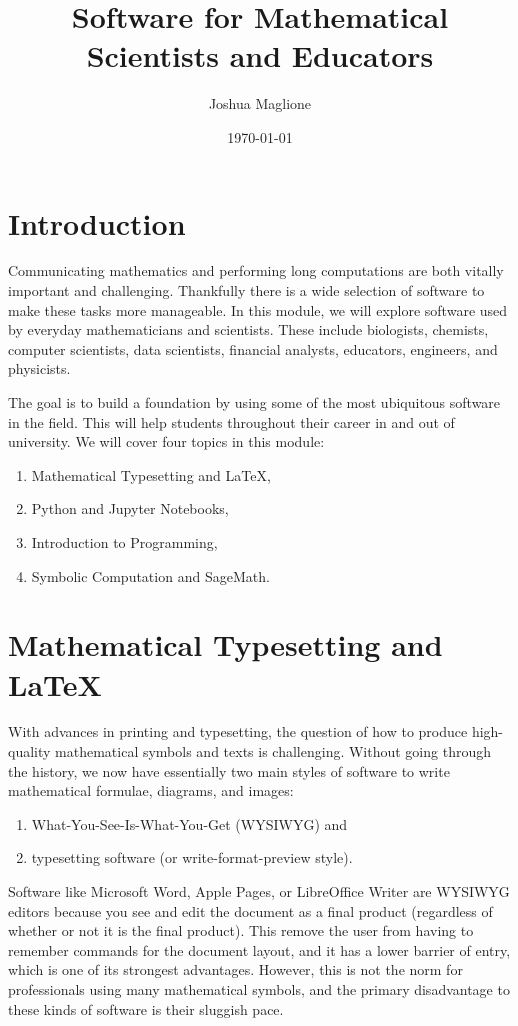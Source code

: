 \documentclass[a4paper, 12pt]{article}
\title{Software for Mathematical Scientists and Educators}
\author{Joshua Maglione}
\date{\today}
\numberwithin{equation}{section}
\numberwithin{figure}{section}
\theoremstyle{definition}
\begin{document}
\maketitle
\tableofcontents

\section*{Introduction}

Communicating mathematics and performing long computations are both vitally
important and challenging. Thankfully there is a wide selection of software to
make these tasks more manageable. In this module, we will explore software used
by everyday mathematicians and scientists. These include biologists, chemists,
computer scientists, data scientists, financial analysts, educators, engineers,
and physicists. 

The goal is to build a foundation by using some of the most ubiquitous software
in the field. This will help students throughout their career in and out of
university. We will cover four topics in this module:
\begin{enumerate} 
	\item Mathematical Typesetting and \LaTeX,
	\item Python and Jupyter Notebooks,
	\item Introduction to Programming,
	\item Symbolic Computation and SageMath.
\end{enumerate}


\section{Mathematical Typesetting and \LaTeX}

With advances in printing and typesetting, the question of how to produce
high-quality mathematical symbols and texts is challenging. Without going
through the history, we now have essentially two main styles of software to
write mathematical formulae, diagrams, and images:
\begin{enumerate}
	\item What-You-See-Is-What-You-Get (WYSIWYG) and
	\item typesetting software (or write-format-preview style).
\end{enumerate}

Software like Microsoft Word, Apple Pages, or LibreOffice Writer are WYSIWYG
editors because you see and edit the document as a final product (regardless of
whether or not it is the final product). This remove the user from having to
remember commands for the document layout, and it has a lower barrier of entry,
which is one of its strongest advantages. However, this is not the norm for
professionals using many mathematical symbols, and the primary disadvantage to
these kinds of software is their sluggish pace. 
\end{document}
